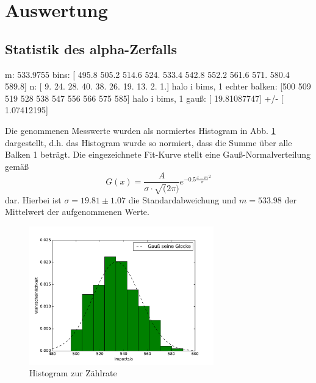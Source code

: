 \section{Auswertung}
\label{sec:Auswertung}

\subsection{Statistik des alpha-Zerfalls}

m:  533.9755
bins:  [ 495.8  505.2  514.6  524.   533.4  542.8  552.2  561.6  571.   580.4
  589.8]
n:  [  9.  24.  28.  40.  38.  26.  19.  13.   2.   1.]
halo i bims, 1 echter balken:  [500 509 519 528 538 547 556 566 575 585]
halo i bims, 1 gauß:  [ 19.81087747] +/- [ 1.07412195]


Die genommenen Messwerte wurden als normiertes Histogram in Abb. \ref{fig:hist} dargestellt, d.h. das Histogram wurde so normiert, dass die Summe über alle Balken 1 beträgt. Die eingezeichnete Fit-Kurve stellt eine Gauß-Normalverteilung gemäß
\begin{equation}
  G(x) = \frac{A}{\sigma\cdot\sqrt(2\pi)}e^{-0.5 {\frac{x-m}{\sigma}}^2}
  \label{eqn:gauß}
\end{equation}
dar. Hierbei ist  $\sigma=19.81 \pm 1.07$ die Standardabweichung und $m= 533.98$ der Mittelwert der aufgenommenen Werte.

 \begin{figure}
   \centering
   \includegraphics[height=6cm]{plots/Statistik.pdf}
   \caption{Histogram zur Zählrate}
   \label{fig:hist}
 \end{figure}
